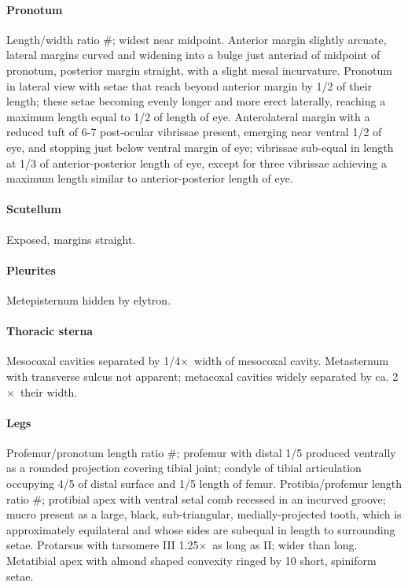\documentclass[fleqn,10pt,lineno]{wlpeerj} %
\newcommand{\x}{$\times$~}
\begin{document}
			\paragraph{Pronotum}
				Length/width ratio \#; widest near midpoint. 
				Anterior margin slightly arcuate, lateral margins curved and widening into a bulge just anteriad of midpoint of pronotum, posterior margin straight, with a slight mesal incurvature. 
				Pronotum in lateral view with setae that reach beyond anterior margin by 1/2 of their length; these setae becoming evenly longer and more erect laterally, reaching a maximum length equal to 1/2 of length of eye. 
				Anterolateral margin with a reduced tuft of 6-7 post-ocular vibrissae present, emerging near ventral 1/2 of eye, and stopping just below ventral margin of eye; vibrissae sub-equal in length at 1/3 of anterior-posterior length of eye, except for three vibrissae achieving a maximum length similar to anterior-posterior length of eye.
			\paragraph{Scutellum}
				Exposed, margins straight.
			\paragraph{Pleurites}
				Metepisternum hidden by elytron.
			\paragraph{Thoracic sterna}
				Mesocoxal cavities separated by 1/4\x width of mesocoxal cavity. 
				Metasternum with transverse sulcus not apparent; metacoxal cavities widely separated by ca. 2\x their width.
			\paragraph{Legs}
				Profemur/pronotum length ratio \#; profemur with distal 1/5 produced ventrally as a rounded projection covering tibial joint; condyle of tibial articulation occupying 4/5 of distal surface and 1/5 length of femur. 
				Protibia/profemur length ratio \#; protibial apex with ventral setal comb recessed in an incurved groove; mucro present as a large, black, sub-triangular, medially-projected tooth, which is approximately equilateral and whose sides are subequal in length to surrounding setae. 
				Protarsus with tarsomere III 1.25\x as long as II; wider than long. 
				Metatibial apex with almond shaped convexity ringed by 10 short, spiniform setae.
\end{document}

